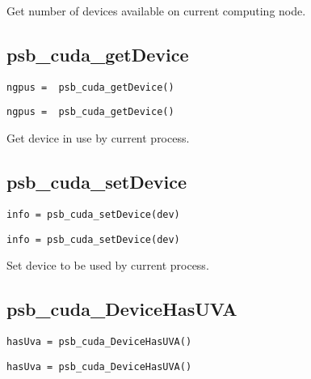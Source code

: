 Get number of devices available on current computing node. 

\subsection*{psb\_cuda\_getDevice }

\ifpdf
\begin{verbatim}
ngpus =  psb_cuda_getDevice()
\end{verbatim}
\else
\begin{center}
    \begin{minipage}[tl]{0.9\textwidth}
\begin{verbatim} 
ngpus =  psb_cuda_getDevice()
\end{verbatim}
    \end{minipage}
  \end{center}
\fi

Get  device in use by current process. 

\subsection*{psb\_cuda\_setDevice }

\ifpdf
\begin{verbatim}
info = psb_cuda_setDevice(dev)
\end{verbatim}
\else
\begin{center}
    \begin{minipage}[tl]{0.9\textwidth}
\begin{verbatim} 
info = psb_cuda_setDevice(dev)
\end{verbatim}
    \end{minipage}
  \end{center}
\fi

Set  device to be used  by current process. 

\subsection*{psb\_cuda\_DeviceHasUVA }

\ifpdf
\begin{verbatim}
hasUva = psb_cuda_DeviceHasUVA()
\end{verbatim}
\else
\begin{center}
    \begin{minipage}[tl]{0.9\textwidth}
\begin{verbatim} 
hasUva = psb_cuda_DeviceHasUVA()
\end{verbatim}
    \end{minipage}
  \end{center}
\fi

